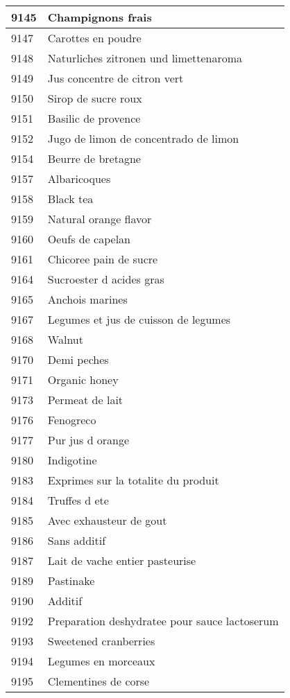 \begin{longtable}{|l|l|}
9145 & Champignons frais \\ \hline 
9147 & Carottes en poudre \\ \hline 
9148 & Naturliches zitronen und limettenaroma \\ \hline 
9149 & Jus concentre de citron vert \\ \hline 
9150 & Sirop de sucre roux \\ \hline 
9151 & Basilic de provence \\ \hline 
9152 & Jugo de limon de concentrado de limon \\ \hline 
9154 & Beurre de bretagne \\ \hline 
9157 & Albaricoques \\ \hline 
9158 & Black tea \\ \hline 
9159 & Natural orange flavor \\ \hline 
9160 & Oeufs de capelan \\ \hline 
9161 & Chicoree pain de sucre \\ \hline 
9164 & Sucroester d acides gras \\ \hline 
9165 & Anchois marines \\ \hline 
9167 & Legumes et jus de cuisson de legumes \\ \hline 
9168 & Walnut \\ \hline 
9170 & Demi peches \\ \hline 
9171 & Organic honey \\ \hline 
9173 & Permeat de lait \\ \hline 
9176 & Fenogreco \\ \hline 
9177 & Pur jus d orange \\ \hline 
9180 & Indigotine \\ \hline 
9183 & Exprimes sur la totalite du produit \\ \hline 
9184 & Truffes d ete \\ \hline 
9185 & Avec exhausteur de gout \\ \hline 
9186 & Sans additif \\ \hline 
9187 & Lait de vache entier pasteurise \\ \hline 
9189 & Pastinake \\ \hline 
9190 & Additif \\ \hline 
9192 & Preparation deshydratee pour sauce lactoserum \\ \hline 
9193 & Sweetened cranberries \\ \hline 
9194 & Legumes en morceaux \\ \hline 
9195 & Clementines de corse \\ \hline 

\end{longtable}
